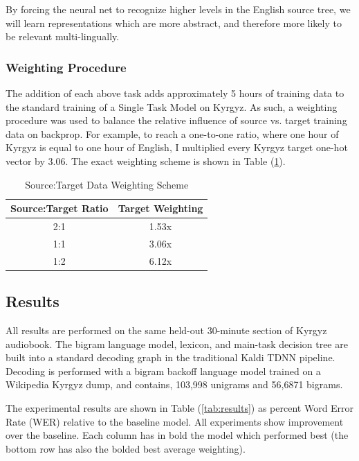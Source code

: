 \documentclass[a4paper]{article}
\begin{document}
By forcing the neural net to recognize higher levels in the English source tree, we will learn representations which are more abstract, and therefore more likely to be relevant multi-lingually. 


\subsubsection{Weighting Procedure}

The addition of each above task adds approximately 5 hours of training data to the standard training of a Single Task Model on Kyrgyz. As such, a weighting procedure was used to balance the relative influence of source vs. target training data on backprop. For example, to reach a one-to-one ratio, where one hour of Kyrgyz is equal to one hour of English, I multiplied every Kyrgyz target one-hot vector by $3.06$. The exact weighting scheme is shown in Table (\ref{tab:weights}).

\begin{table}[!htbp]
  \centering
  \caption{Source:Target Data Weighting Scheme}
  \label{tab:weights}
  \begin{adjustbox}{width=.3\textwidth}
    \begin{tabular}{cc}
      \toprule
      \textbf{Source:Target Ratio} & \textbf{Target Weighting}\\
      \midrule
      2:1 & 1.53x  \\
      1:1 & 3.06x  \\
      1:2 & 6.12x  \\
      \bottomrule
    \end{tabular}
  \end{adjustbox}
\end{table}




\subsection{Results}


All results are performed on the same held-out 30-minute section of Kyrgyz audiobook. The bigram language model, lexicon, and main-task decision tree are built into a standard decoding graph in the traditional Kaldi TDNN pipeline. Decoding is performed with a bigram backoff language model trained on a Wikipedia Kyrgyz dump, and contains, 103,998 unigrams and 56,6871 bigrams.

The experimental results are shown in Table (\ref{tab:results}) as percent Word Error Rate (WER) relative to the baseline model. All experiments show improvement over the baseline. Each column has in bold the model which performed best (the bottom row has also the bolded best average weighting).
\end{document}

